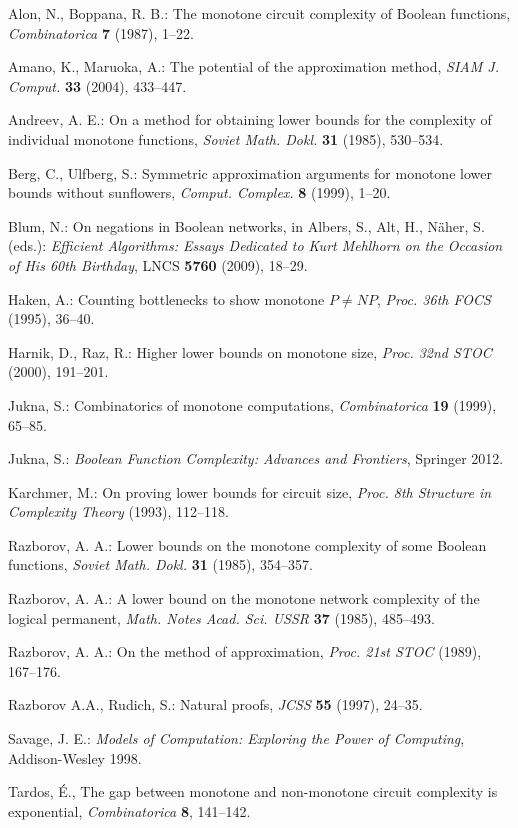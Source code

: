 \documentclass[11pt]{article}
\begin{document}
\begin{thebibliography}{99}

 Alon, N., Boppana, R. B.: The monotone circuit complexity of Boolean functions,
{\em Combinatorica\/} {\bf 7} (1987), 1--22.

 Amano, K., Maruoka, A.: The potential of the approximation method, 
{\em SIAM J. Comput.\/} {\bf 33} (2004), 433--447.

 Andreev, A. E.: On a method for obtaining lower bounds for the complexity of
individual monotone functions, {\em Soviet Math. Dokl.\/} {\bf 31} (1985), 530--534.

 Berg, C., Ulfberg, S.: Symmetric approximation arguments for monotone lower
bounds without sunflowers, {\em Comput. Complex.\/} {\bf 8} (1999), 1--20.

 Blum, N.: On negations in Boolean networks, in Albers, S., Alt, H., N\"aher, S. (eds.):
{\em Efficient Algorithms: Essays Dedicated to Kurt Mehlhorn on the Occasion of His 60th Birthday},
LNCS {\bf 5760} (2009), 18--29.

 Haken, A.: Counting bottlenecks to show monotone $P \not= NP$, 
{\em Proc. 36th FOCS\/} (1995), 36--40.

 Harnik, D., Raz, R.: Higher lower bounds on monotone size, {\em Proc. 32nd STOC\/}
(2000), 191--201.

 Jukna, S.: Combinatorics of monotone computations, {\em Combinatorica\/} {\bf 19} 
(1999), 65--85.

 Jukna, S.:  {\em Boolean Function Complexity: Advances and Frontiers\/}, Springer 
2012.

 Karchmer, M.: On proving lower bounds for circuit size, {\em Proc. 8th Structure
in Complexity Theory\/} (1993), 112--118.

 Razborov, A. A.: Lower bounds on the monotone complexity of some Boolean 
functions, {\em Soviet Math. Dokl.\/} {\bf 31} (1985), 354--357.

 Razborov, A. A.: A lower bound on the monotone network complexity of the logical
permanent, {\em Math. Notes Acad. Sci. USSR\/} {\bf 37} (1985), 485--493.

 Razborov, A. A.: On the method of approximation, {\em Proc. 21st STOC\/} (1989),
167--176.

 Razborov A.A., Rudich, S.: Natural proofs, {\em JCSS\/} {\bf 55} (1997), 24--35.

 Savage, J. E.: {\em Models of Computation: Exploring the Power of Computing\/}, Addison-Wesley
  1998.

 Tardos, \'{E}., The gap between monotone and non-monotone circuit complexity is exponential,
{\em Combinatorica\/} {\bf 8}, 141--142.


\end{thebibliography}
\end{document}
